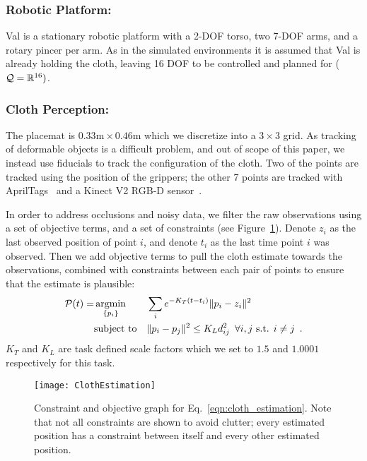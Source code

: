 \subsubsection{Robotic Platform:}
Val is a stationary robotic platform with a 2-DOF torso, two 7-DOF arms, and a rotary pincer per arm. As in the simulated environments it is assumed that Val is already holding the cloth, leaving 16 DOF to be controlled and planned for ($\mathcal{Q} = \mathbb{R}^{16})$.


\subsubsection{Cloth Perception:}
\label{sec:cloth_perception}

The placemat is $0.33\text{m} \times 0.46\text{m}$ which we discretize into a $3 \times 3$ grid. As tracking of deformable objects is a difficult problem, and out of scope of this paper, we instead use fiducials to track the configuration of the cloth. Two of the points are tracked using the position of the grippers; the other 7 points are tracked with AprilTags~\cite{olson2011tags} and a Kinect V2 RGB-D sensor~\cite{iai_kinect2}.

In order to address occlusions and noisy data, we filter the raw observations using a set of objective terms, and a set of constraints (see Figure~\ref{fig:cloth_estimation}). Denote $z_i$ as the last observed position of point $i$, and denote $t_i$ as the last time point $i$ was observed. Then we add objective terms to pull the cloth estimate towards the observations, combined with constraints between each pair of points to ensure that the estimate is plausible:
\begin{equation}
\begin{aligned}
    \mathcal{P}(t) = &\operatorname*{argmin}_{\{ p_i \}} 
            & & \sum_i e^{-K_T(t - t_i)} \| p_i - z_i \|^2 \\
            & \text{subject to}
            & & \| p_i - p_j \|^2 \leq K_L d_{ij}^2 \enspace \forall i, j \text{ s.t. } i \neq j \enspace .
\end{aligned}
\label{eqn:cloth_estimation}
\end{equation}
$K_T$ and $K_L$ are task defined scale factors which we set to $1.5$ and $1.0001$ respectively for this task.

\begin{figure}[h]
    \centering
    \texttt{[image: ClothEstimation]}
    \caption{Constraint and objective graph for Eq.~\eqref{eqn:cloth_estimation}. Note that not all constraints are shown to avoid clutter; every estimated position has a constraint between itself and every other estimated position.}
    \label{fig:cloth_estimation}
\end{figure}

